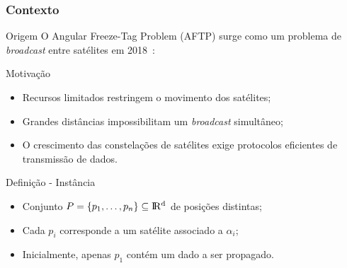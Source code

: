 
\subsubsection{Contexto}

\stopcounter
\begin{frame}{Origem}
  O Angular Freeze-Tag Problem (AFTP) surge como um problema de \emph{broadcast} entre satélites em 2018~\cite{Fe18}:
  \bigbreak
  \begin{minipage}{\linewidth}
    \centering
    \colorbox{white}{}
  \end{minipage}
\end{frame}
\inccounter

\begin{frame}{Motivação}
  \begin{itemize}[<+->]

    \item Recursos limitados restringem o movimento dos satélites;

    \item Grandes distâncias impossibilitam um \emph{broadcast} simultâneo;

    \item O crescimento das constelações de satélites exige protocolos eficientes de transmissão de dados.

  \end{itemize}
\end{frame}

\begin{frame}{Definição - Instância}
  \begin{itemize}[<+->]

    \item Conjunto $P = \{p_1, \dots, p_n\}\subseteq \rm I\!R^d$ de posições distintas;

    \item Cada $p_i$ corresponde a um satélite associado a $\alpha_i$;

    \item Inicialmente, apenas $p_1$ contém um dado a ser propagado.

  \end{itemize}
\end{frame}

